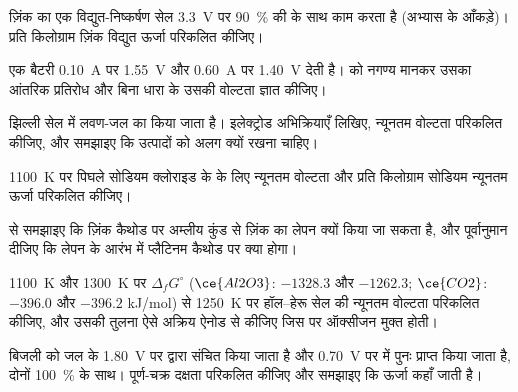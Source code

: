 \begin{exercise}[$\star\star$]\label{exo:b2:batteries-electrolysis:6}
ज़िंक का एक विद्युत-निष्कर्षण सेल \qty{3.3}{V} पर 90~\% की  के साथ काम करता है
(अभ्यास के आँकड़े)। प्रति किलोग्राम ज़िंक विद्युत ऊर्जा परिकलित कीजिए।
\end{exercise}

\begin{exercise}[$\star\star$]\label{exo:b2:batteries-electrolysis:7}
एक बैटरी \qty{0.10}{A} पर \qty{1.55}{V} और \qty{0.60}{A} पर \qty{1.40}{V} देती है।
 को नगण्य मानकर उसका आंतरिक प्रतिरोध और बिना धारा के
उसकी वोल्टता ज्ञात कीजिए।
\end{exercise}

\begin{exercise}[$\star\star$]\label{exo:b2:batteries-electrolysis:8}
झिल्ली सेल में लवण-जल का  किया जाता है। इलेक्ट्रोड अभिक्रियाएँ लिखिए,
न्यूनतम वोल्टता परिकलित कीजिए, और समझाइए कि उत्पादों को अलग क्यों रखना
चाहिए।
\end{exercise}

\begin{exercise}[$\star\star$]\label{exo:b2:batteries-electrolysis:9}
\qty{1100}{K} पर पिघले सोडियम क्लोराइड के  के लिए न्यूनतम वोल्टता और
प्रति किलोग्राम सोडियम न्यूनतम ऊर्जा परिकलित कीजिए।
\end{exercise}

\begin{exercise}[$\star\star\star$]\label{exo:b2:batteries-electrolysis:10}
 से समझाइए कि ज़िंक कैथोड पर अम्लीय कुंड से ज़िंक का लेपन क्यों
किया जा सकता है, और पूर्वानुमान दीजिए कि लेपन के आरंभ में प्लैटिनम कैथोड पर
क्या होगा।
\end{exercise}

\begin{exercise}[$\star\star\star$]\label{exo:b2:batteries-electrolysis:11}
\qty{1100}{K} और \qty{1300}{K} पर $\Delta_f G^\circ$ ($\ce{Al2O3}$: $-1328.3$ और
$-1262.3$; $\ce{CO2}$: $-396.0$ और $-396.2$ \unit{kJ/mol}) से \qty{1250}{K} पर हॉल--हेरू
सेल की न्यूनतम वोल्टता परिकलित कीजिए, और उसकी तुलना ऐसे अक्रिय ऐनोड से कीजिए
जिस पर ऑक्सीजन मुक्त होती।
\end{exercise}

\begin{exercise}[$\star\star\star$]\label{exo:b2:batteries-electrolysis:12}
बिजली को जल के \qty{1.80}{V} पर  द्वारा संचित किया जाता है और
\qty{0.70}{V} पर  में पुनः प्राप्त किया जाता है, दोनों 100~\%  के साथ।
पूर्ण-चक्र दक्षता परिकलित कीजिए और समझाइए कि ऊर्जा कहाँ जाती है।
\end{exercise}

